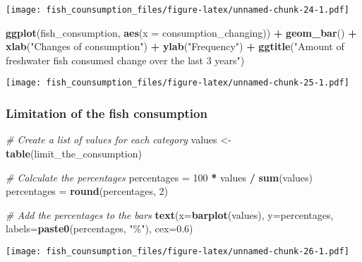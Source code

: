 \documentclass[
]{article}
\newenvironment{Shaded}{\begin{snugshade}}{\end{snugshade}}
\newcommand{\AttributeTok}[1]{\textcolor[rgb]{0.13,0.29,0.53}{#1}}
\newcommand{\CommentTok}[1]{\textcolor[rgb]{0.56,0.35,0.01}{\textit{#1}}}
\newcommand{\DecValTok}[1]{\textcolor[rgb]{0.00,0.00,0.81}{#1}}
\newcommand{\FloatTok}[1]{\textcolor[rgb]{0.00,0.00,0.81}{#1}}
\newcommand{\FunctionTok}[1]{\textcolor[rgb]{0.13,0.29,0.53}{\textbf{#1}}}
\newcommand{\NormalTok}[1]{#1}
\newcommand{\OtherTok}[1]{\textcolor[rgb]{0.56,0.35,0.01}{#1}}
\newcommand{\SpecialCharTok}[1]{\textcolor[rgb]{0.81,0.36,0.00}{\textbf{#1}}}
\newcommand{\StringTok}[1]{\textcolor[rgb]{0.31,0.60,0.02}{#1}}
\begin{document}
\texttt{[image: fish\_counsumption\_files/figure-latex/unnamed-chunk-24-1.pdf]}

\begin{Shaded}
\begin{Highlighting}[]
\FunctionTok{ggplot}\NormalTok{(fish\_consumption, }\FunctionTok{aes}\NormalTok{(}\AttributeTok{x =}\NormalTok{ consumption\_changing)) }\SpecialCharTok{+}
  \FunctionTok{geom\_bar}\NormalTok{() }\SpecialCharTok{+}
  \FunctionTok{xlab}\NormalTok{(}\StringTok{"Changes of consumption"}\NormalTok{) }\SpecialCharTok{+}
  \FunctionTok{ylab}\NormalTok{(}\StringTok{"Frequency"}\NormalTok{) }\SpecialCharTok{+}
  \FunctionTok{ggtitle}\NormalTok{(}\StringTok{"Amount of freshwater fish consumed change over the last 3 years"}\NormalTok{)}
\end{Highlighting}
\end{Shaded}

\texttt{[image: fish\_counsumption\_files/figure-latex/unnamed-chunk-25-1.pdf]}

\hypertarget{limitation-of-the-fish-consumption}{%
\subsubsection{Limitation of the fish
consumption}\label{limitation-of-the-fish-consumption}}

\begin{Shaded}
\begin{Highlighting}[]
\CommentTok{\# Create a list of values for each category}
\NormalTok{values }\OtherTok{\textless{}{-}} \FunctionTok{table}\NormalTok{(limit\_the\_consumption)}

\CommentTok{\# Calculate the percentages}
\NormalTok{percentages }\OtherTok{=} \DecValTok{100} \SpecialCharTok{*}\NormalTok{ values }\SpecialCharTok{/} \FunctionTok{sum}\NormalTok{(values)}
\NormalTok{percentages }\OtherTok{=} \FunctionTok{round}\NormalTok{(percentages, }\DecValTok{2}\NormalTok{)}

\CommentTok{\# Add the percentages to the bars}
\FunctionTok{text}\NormalTok{(}\AttributeTok{x=}\FunctionTok{barplot}\NormalTok{(values), }\AttributeTok{y=}\NormalTok{percentages, }\AttributeTok{labels=}\FunctionTok{paste0}\NormalTok{(percentages, }\StringTok{"\%"}\NormalTok{), }\AttributeTok{cex=}\FloatTok{0.6}\NormalTok{)}
\end{Highlighting}
\end{Shaded}

\texttt{[image: fish\_counsumption\_files/figure-latex/unnamed-chunk-26-1.pdf]}
\end{document}
